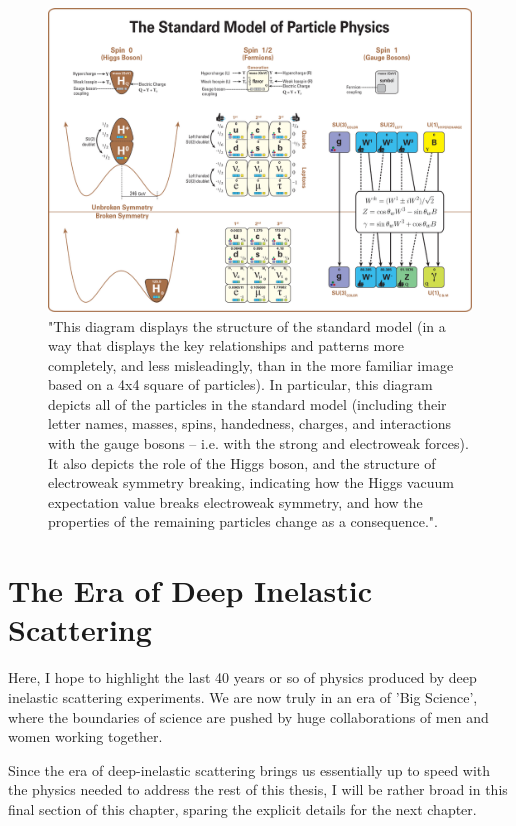 \begin{figure}[ht]
	\centering
	\includegraphics[width=\linewidth]{./figures/standard_model_complete_lowres.png}
	\caption{
		"This diagram displays the structure of the standard model (in a way that
		displays the key relationships and patterns more completely, and less
		misleadingly, than in the more familiar image based on a 4x4 square of
		particles). In particular, this diagram depicts all of the particles in the
		standard model (including their letter names, masses, spins, handedness,
		charges, and interactions with the gauge bosons -- i.e. with the strong and
		electroweak forces). It also depicts the role of the Higgs boson, and the
		structure of electroweak symmetry breaking, indicating how the Higgs vacuum
		expectation value breaks electroweak symmetry, and how the properties of the
		remaining particles change as a consequence."\cite{Boyle2014}.
	}
	\label{fig:standardmodel}
\end{figure}


\clearpage
\section{The Era of Deep Inelastic Scattering}

Here, I hope to highlight the last 40 years or so of physics produced by deep
inelastic scattering experiments. We are now truly in an era of 'Big Science',
where the boundaries of science are pushed by huge collaborations of men and
women working together. 

Since the era of deep-inelastic scattering brings us essentially up to speed
with the physics needed to address the rest of this thesis, I will be rather
broad in this final section of this chapter, sparing the explicit details for
the next chapter.

